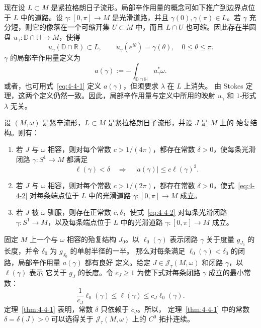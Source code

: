 现在设 $L\subset M$ 是紧拉格朗日子流形。局部辛作用量的概念可如下推广到边界点位于
$L$ 中的道路。设 $\gamma:[0,\pi]\to M$ 是光滑道路，并且
$\gamma(0),\gamma(\pi)\in L$。若 $\gamma$ 充分短，则它的像落在一个可缩开集
$U\subset M$ 中，而且 $L\cap U$ 也可缩。因此存在半圆盘
$u_\gamma:\mathbb D\cap\mathbb H\to M$，使得
\[
  u_\gamma(\mathbb D\cap\mathbb R)\subset L,
  \qquad
  u_\gamma(e^{i\theta})=\gamma(\theta),
  \quad 0\le\theta\le\pi.
\]
$\gamma$ 的局部辛作用量定义为
\[
  a(\gamma):=-\int_{\mathbb D\cap\mathbb H}u_\gamma^*\omega.
\]
或者，也可用式~\eqref{eq:4-4-1} 定义 $a(\gamma)$，但须要求 $\lambda$ 在 $L$ 上消失。
由 Stokes 定理，这两个定义仍然一致。因此，局部辛作用量与定义中所用的映射
$u_\gamma$ 和 $1$-形式 $\lambda$ 无关。

\begin{theorem}\label{thm:4-4-1}
设 $(M,\omega)$ 是紧辛流形，$L\subset M$ 是紧拉格朗日子流形，并设 $J$ 是 $M$ 上的
殆复结构。则有：
\begin{enumerate}[label=(\roman*),leftmargin=3em]
\item 若 $J$ 与 $\omega$ 相容，则对每个常数 $c>1/(4\pi)$，都存在常数
$\delta>0$，使每条光滑闭路 $\gamma:S^1\to M$ 都满足
\begin{equation}\label{eq:4-4-2}
  \ell(\gamma)<\delta
  \quad\Longrightarrow\quad
  |a(\gamma)|\le c\ell(\gamma)^2.
\end{equation}
\item 若 $J$ 与 $\omega$ 相容，则对每个常数 $c>1/(2\pi)$，都存在常数
$\delta>0$，使式~\eqref{eq:4-4-2} 对每条端点位于 $L$ 中的光滑道路
$\gamma:[0,\pi]\to M$ 成立。
\item 若 $J$ 被 $\omega$ 驯服，则存在正常数 $c,\delta$，使式~\eqref{eq:4-4-2}
对每条光滑闭路 $\gamma:S^1\to M$，以及每条端点位于 $L$ 中的光滑道路
$\gamma:[0,\pi]\to M$ 成立。
\end{enumerate}
\end{theorem}

\begin{remark}\label{rem:4-4-2}
固定 $M$ 上一个与 $\omega$ 相容的殆复结构 $J_0$。以 $\ell_0(\gamma)$ 表示闭路
$\gamma$ 关于度量 $g_{J_0}$ 的长度，并令 $\delta_0$ 为 $g_{J_0}$ 的单射半径的一半。
那么对每条满足 $\ell_0(\gamma)<\delta_0$ 的闭路，局部辛作用量 $a(\gamma)$ 都有良好
定义。给定 $J\in\mathcal J_\tau(M,\omega)$ 和闭路 $\gamma$，以 $\ell(\gamma)$ 表示
它关于 $g_J$ 的长度。令 $c_J\ge1$ 为使下式对每条闭路 $\gamma$ 成立的最小常数：
\[
  \frac1{c_J}\ell_0(\gamma)
  \le\ell(\gamma)\le c_J\ell_0(\gamma).
\]
定理~\ref{thm:4-4-1} 表明，常数 $\delta$ 只依赖于 $c_J$。所以，
定理~\ref{thm:4-4-1} 中的常数 $\delta=\delta(J)>0$ 可以选得关于
$\mathcal J_\tau(M,\omega)$ 上的 $C^0$ 拓扑连续。
\end{remark}

